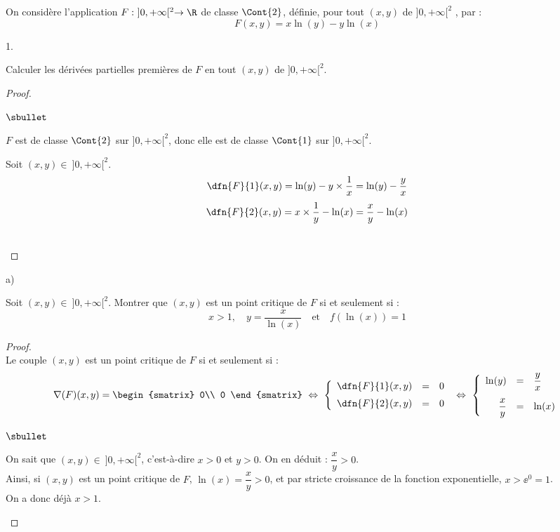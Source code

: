 \documentclass[11pt]{article}%
\begin{document}
\noindent
On considère l'application $F: \ ]0,+\infty[^2 \to \R$ de 
classe $\Cont{2}$, définie, pour tout $(x,y)$ de $]0,+\infty[^2$ , par 
: 
\[
F(x,y)=x\ln(y)-y\ln(x)
\]
\begin{noliste}{1.}
  \setlength{\itemsep}{2mm} %
  \setcounter{enumi}{5}
\item Calculer les dérivées partielles premières de $F$ en tout
  $(x,y)$ de $]0,+\infty[^2$.

  \begin{proof}~
    \begin{noliste}{$\sbullet$}
    \item $F$ est de classe $\Cont{2}$ sur $]0,+\infty[^2$, donc elle
      est de classe $\Cont{1}$ sur $]0,+\infty[^2$.
      
    \item Soit $(x,y)\in \ ]0,+\infty[^2$.
      \[
      \dfn{F}{1}(x,y)=\ln(y)-y\times \dfrac{1}{x} = \ln(y) - \dfrac{y}{x}
      \]
      \[
      \dfn{F}{2}(x,y)=x\times \dfrac{1}{y} -\ln(x) = \dfrac{x}{y} - \ln(x)
      \]
    \end{noliste}
    \conc{$\forall (x,y)\in \ ]0,+\infty[^2$, $\dfn{F}{1}(x,y) = \ln(y) - 
      \dfrac{y}{x}$ \ et \ $\dfn{F}{2}(x,y) = \dfrac{x}{y} -
      \ln(x)$}~\\[-1cm] 
  \end{proof}
  

\item
\begin{noliste}{a)}
\item Soit $(x,y)\in \ ]0,+\infty[^2$. Montrer que $(x,y)$ est un point 
critique de $F$ si et seulement si :
\[
x > 1, \quad y=\dfrac{x}{\ln(x)} \quad \text{et} \quad 
f\left(\ln(x)\right)=1
\]

\begin{proof}~\\
 Le couple $(x,y)$ est un point critique de $F$ si et seulement si :
 \[
   \nabla(F)(x,y) = 
   \begin{smatrix}
    0\\
    0
   \end{smatrix}
   \ \Leftrightarrow \
   \left\{
   \begin{array}{rcl}
    \dfn{F}{1}(x,y) &=& 0\\[.2cm]
    \dfn{F}{2}(x,y) &=& 0
   \end{array}
   \right.
   \ \Leftrightarrow \
   \left\{
   \begin{array}{rcl}
    \ln(y) &=& \dfrac{y}{x}\\[.4cm]
    \dfrac{x}{y} &=& \ln(x)
   \end{array}
   \right.
 \]
 \begin{noliste}{$\sbullet$}
 \item On sait que $(x,y)\in \ ]0,+\infty[^2$, c'est-à-dire $x>0$ et
   $y>0$. On en déduit : $\dfrac{x}{y} > 0$.\\
   Ainsi, si $(x,y)$ est un point critique de $F$,
   $\ln(x)=\dfrac{x}{y} >0$, et par stricte croissance de la
   fonction exponentielle, $x>\ee^0=1$.\\
   On a donc déjà $x>1$.
  

\end{noliste}
\end{proof}
\end{noliste}
\end{noliste}
\end{document}
